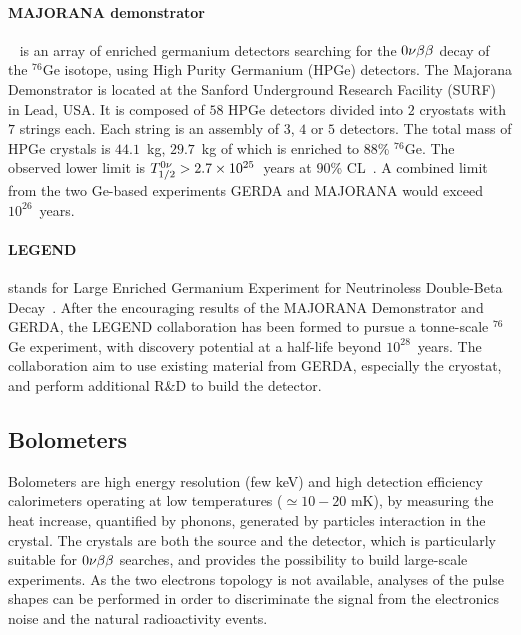 \paragraph{MAJORANA demonstrator}~\cite{art:MAJORANA_2014} is an array of enriched germanium detectors searching for the $0\nu\beta\beta$ decay of the $^{76}$Ge isotope, using High Purity Germanium (HPGe) detectors.
The Majorana Demonstrator is located at the Sanford Underground Research Facility (SURF) in Lead, USA.
It is composed of $58$ HPGe detectors divided into $2$ cryostats with $7$ strings each.
Each string is an assembly of $3$, $4$ or $5$ detectors.
The total mass of HPGe crystals is $44.1$~kg, $29.7$~kg of which is enriched to $88$\% $^{76}$Ge.
The observed lower limit is $T_{1/2}^{0\nu}>2.7\times 10^{25}$~years at $90$\% CL~\cite{art:majorana2019}.
A combined limit from the two Ge-based experiments GERDA and MAJORANA would exceed $10^{26}$~years.

\paragraph{LEGEND} stands for Large Enriched Germanium Experiment for Neutrinoless Double-Beta Decay~\cite{proc:LEGEND_2019}.
After the encouraging results of the MAJORANA Demonstrator and GERDA, the LEGEND collaboration has been formed to pursue a tonne-scale $^{76}$Ge experiment, with discovery potential at a half-life beyond $10^{28}$~years.
The collaboration aim to use existing material from GERDA, especially the cryostat, and perform additional R\&D to build the detector.

\subsection{Bolometers}
\label{subsec:bolometers}

Bolometers are high energy resolution (few keV) and high detection efficiency calorimeters operating at low temperatures ($\simeq 10-20$ mK), by measuring the heat increase, quantified by phonons, generated by particles interaction in the crystal.
The crystals are both the source and the detector, which is particularly suitable for $0\nu\beta\beta$ searches, and provides the possibility to build large-scale experiments.
As the two electrons topology is not available, analyses of the pulse shapes can be performed in order to discriminate the signal from the electronics noise and the natural radioactivity events.

